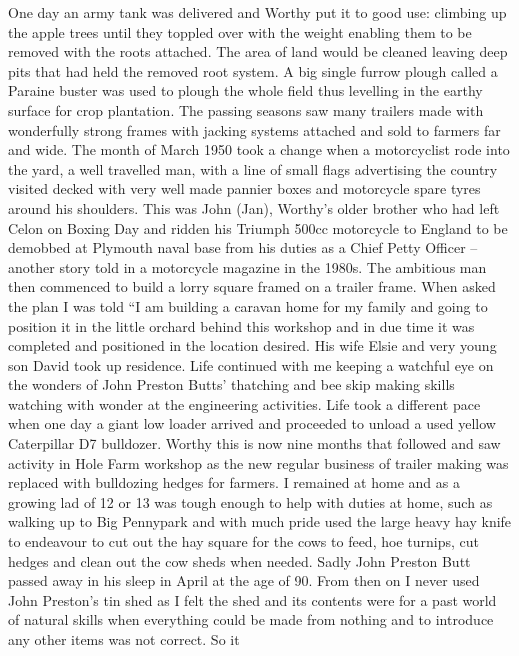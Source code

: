 
One day an army tank was delivered and Worthy put it to good use: climbing up
the apple trees until they toppled over with the weight enabling them to be
removed with the roots attached.  The area of land would be cleaned leaving
deep pits that had held the removed root system. A big single furrow plough
called a Paraine buster was used to plough the whole field thus levelling in
the earthy surface for crop plantation.  The passing seasons saw many trailers
made with wonderfully strong frames with jacking systems attached and sold to
farmers far and wide. The month of March 1950 took a change when a motorcyclist
rode into the yard, a well travelled man, with a line of small flags
advertising the country visited decked with very well made pannier        boxes
and motorcycle spare tyres around his shoulders.  This was John (Jan), Worthy's
older brother who had left Celon on Boxing Day and ridden his Triumph 500cc
motorcycle to England to be demobbed at Plymouth naval base from his duties as
a Chief Petty Officer – another story told in a motorcycle magazine in the
1980s.  The ambitious man then commenced to build a lorry square framed on a
trailer frame.  When asked the plan I was told ``I am building a caravan home
for my family and going to position it in the little orchard behind this
workshop and in due time it was completed and positioned in the location
desired.  His wife Elsie and very young son David took up residence. Life
continued with me keeping a watchful eye on the wonders of John Preston Butts'
thatching and bee skip making skills watching with wonder at the engineering
activities.  Life took a different pace when one day a giant low loader arrived
and proceeded to unload a used yellow Caterpillar D7 bulldozer.  Worthy this is
now nine months that followed and saw activity in Hole Farm workshop as the new
regular business of trailer making was replaced with bulldozing hedges for
farmers. I remained at home and as a growing lad of 12 or 13 was tough enough
to help with duties at home, such as walking up to Big Pennypark and with much
pride used the large heavy hay knife to endeavour to cut out the hay square for
the cows to feed, hoe turnips, cut hedges and clean out the cow sheds when
needed.  Sadly John Preston Butt passed away in his sleep in April at the age
of 90.  From then on I never used John Preston's tin shed as I felt the shed
and its contents were for a past world of natural skills when everything could
be made from nothing and to introduce any other items was not correct.  So it
